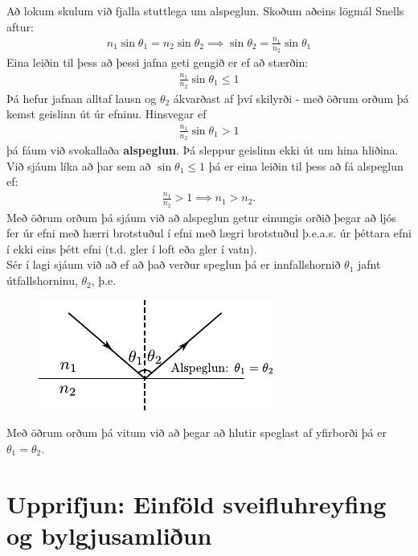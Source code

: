 \ifdefined \wholebook \else\documentclass[oneside]{book}\usepackage{EdlBook}\graphicspath{{figures/}}
\begin{document}
Að lokum skulum við fjalla stuttlega um alspeglun. Skoðum aðeins lögmál Snells aftur:
\begin{align*}
    n_1 \sin\theta_1 = n_2 \sin\theta_2 \implies \sin\theta_2 = \frac{n_1}{n_2}\sin\theta_1
\end{align*}
Eina leiðin til þess að þessi jafna geti gengið er ef að stærðin:
\begin{align*}
    \frac{n_1}{n_2}\sin\theta_1 \leq 1
\end{align*}
Þá hefur jafnan alltaf lausn og $\theta_2$ ákvarðast af því skilyrði - með öðrum orðum þá kemst geislinn út úr efninu. Hinsvegar ef
\begin{align*}
    \frac{n_1}{n_2}\sin\theta_1 > 1
\end{align*}
þá fáum við svokallaða \textbf{alspeglun}. Þá sleppur geislinn ekki út um hina hliðina. Við sjáum líka að þar sem að $\sin\theta_1 \leq 1$ þá er eina leiðin til þess að fá alspeglun ef:
\begin{align*}
    \frac{n_1}{n_2} > 1 \implies n_1 > n_2.
\end{align*}
Með öðrum orðum þá sjáum við að alspeglun getur einungis orðið þegar að ljós fer úr efni með hærri brotstuðul í efni með lægri brotstuðul þ.e.a.s. úr þéttara efni í ekki eins þétt efni (t.d. gler í loft eða gler í vatn). \\

Sér í lagi sjáum við að ef að það verður speglun þá er innfallshornið $\theta_1$ jafnt útfallshorninu, $\theta_2$, þ.e.

\begin{figure}[H]
    \centering
    \includegraphics[scale = 1.5]{figures/snell3.pdf}
\end{figure}
Með öðrum orðum þá vitum við að þegar að hlutir speglast af yfirborði þá er $\theta_1 = \theta_2$.

\section{Upprifjun: Einföld sveifluhreyfing og bylgjusamliðun}
\end{document}
